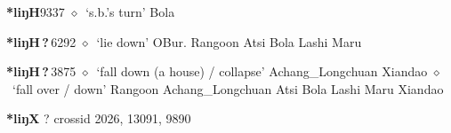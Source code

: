   \begin{list}{}{\leftmargin=1.5em \itemindent=-1.5em}
  \item {\footnotesize \textbf{*liŋH}}{\tiny 9337}
         $\diamond$~`s.b.'s turn'
         Bola 
  \item {\footnotesize \textbf{*liŋH\,?\,}}{\tiny 6292}
\hspace{1ex}
         $\diamond$~`lie down'
         OBur. 
\hspace{1ex}
         Rangoon 
\hspace{1ex}
         Atsi 
\hspace{1ex}
         Bola 
\hspace{1ex}
         Lashi 
\hspace{1ex}
         Maru 
  \item {\footnotesize \textbf{*liŋH\,?\,}}{\tiny 3875}
\hspace{1ex}
         $\diamond$~`fall down (a house) / collapse'
         Achang\_Longchuan 
\hspace{1ex}
         Xiandao 
\hspace{1ex}
         $\diamond$~`fall over / down'
         Rangoon 
\hspace{1ex}
         Achang\_Longchuan 
\hspace{1ex}
         Atsi 
\hspace{1ex}
         Bola 
\hspace{1ex}
         Lashi 
\hspace{1ex}
         Maru 
\hspace{1ex}
         Xiandao 
  \end{list}
\item
\textbf{*liŋX}
?
  {\tiny crossid 2026, 13091, 9890}
